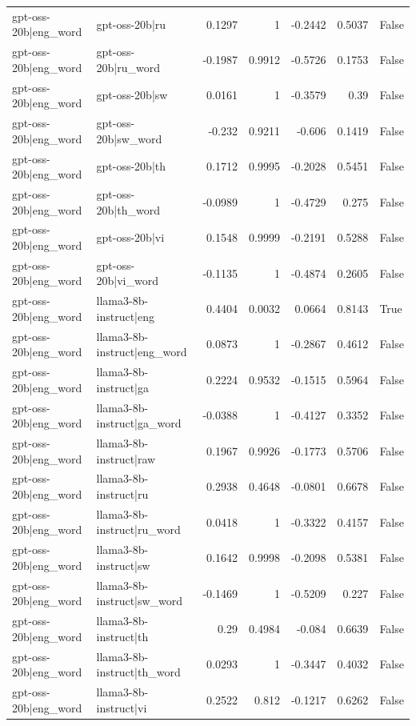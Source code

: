 \begin{table}
\begin{tabular}{l l r r r r l}
gpt-oss-20b|eng_word & gpt-oss-20b|ru & 0.1297 & 1 & -0.2442 & 0.5037 & False \\
gpt-oss-20b|eng_word & gpt-oss-20b|ru_word & -0.1987 & 0.9912 & -0.5726 & 0.1753 & False \\
gpt-oss-20b|eng_word & gpt-oss-20b|sw & 0.0161 & 1 & -0.3579 & 0.39 & False \\
gpt-oss-20b|eng_word & gpt-oss-20b|sw_word & -0.232 & 0.9211 & -0.606 & 0.1419 & False \\
gpt-oss-20b|eng_word & gpt-oss-20b|th & 0.1712 & 0.9995 & -0.2028 & 0.5451 & False \\
gpt-oss-20b|eng_word & gpt-oss-20b|th_word & -0.0989 & 1 & -0.4729 & 0.275 & False \\
gpt-oss-20b|eng_word & gpt-oss-20b|vi & 0.1548 & 0.9999 & -0.2191 & 0.5288 & False \\
gpt-oss-20b|eng_word & gpt-oss-20b|vi_word & -0.1135 & 1 & -0.4874 & 0.2605 & False \\
gpt-oss-20b|eng_word & llama3-8b-instruct|eng & 0.4404 & 0.0032 & 0.0664 & 0.8143 & True \\
gpt-oss-20b|eng_word & llama3-8b-instruct|eng_word & 0.0873 & 1 & -0.2867 & 0.4612 & False \\
gpt-oss-20b|eng_word & llama3-8b-instruct|ga & 0.2224 & 0.9532 & -0.1515 & 0.5964 & False \\
gpt-oss-20b|eng_word & llama3-8b-instruct|ga_word & -0.0388 & 1 & -0.4127 & 0.3352 & False \\
gpt-oss-20b|eng_word & llama3-8b-instruct|raw & 0.1967 & 0.9926 & -0.1773 & 0.5706 & False \\
gpt-oss-20b|eng_word & llama3-8b-instruct|ru & 0.2938 & 0.4648 & -0.0801 & 0.6678 & False \\
gpt-oss-20b|eng_word & llama3-8b-instruct|ru_word & 0.0418 & 1 & -0.3322 & 0.4157 & False \\
gpt-oss-20b|eng_word & llama3-8b-instruct|sw & 0.1642 & 0.9998 & -0.2098 & 0.5381 & False \\
gpt-oss-20b|eng_word & llama3-8b-instruct|sw_word & -0.1469 & 1 & -0.5209 & 0.227 & False \\
gpt-oss-20b|eng_word & llama3-8b-instruct|th & 0.29 & 0.4984 & -0.084 & 0.6639 & False \\
gpt-oss-20b|eng_word & llama3-8b-instruct|th_word & 0.0293 & 1 & -0.3447 & 0.4032 & False \\
gpt-oss-20b|eng_word & llama3-8b-instruct|vi & 0.2522 & 0.812 & -0.1217 & 0.6262 & False \\

\end{tabular}
\end{table}
